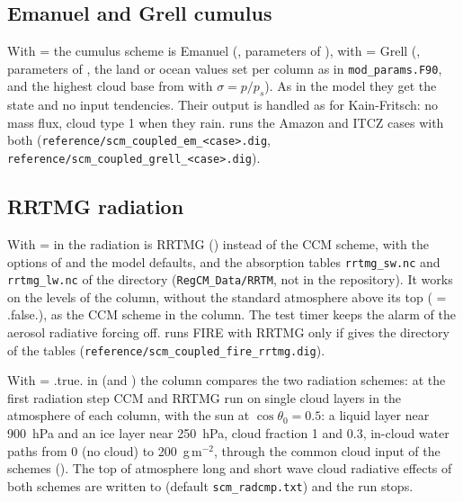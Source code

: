 \subsection{Emanuel and Grell cumulus}

With  =  the cumulus scheme is Emanuel
(, parameters of ), with
 =  Grell
(, parameters of , the land or ocean
values set per column as in \verb=mod_params.F90=, and the highest cloud
base from  with $\sigma = p/p_s$). As in the model they get
the state and no input tendencies. Their output is handled as for
Kain-Fritsch: no mass flux, cloud type 1 when they rain. 
runs the Amazon and ITCZ cases with both
(\verb=reference/scm_coupled_em_<case>.dig=,
\verb=reference/scm_coupled_grell_<case>.dig=).

\subsection{RRTMG radiation}

With  =  in  the
radiation is RRTMG
() instead of the CCM scheme, with the options of
 and the model defaults, and the absorption tables
\verb=rrtmg_sw.nc= and \verb=rrtmg_lw.nc= of the directory
 (\verb=RegCM_Data/RRTM=, not in the repository). It works
on the levels of the column, without the standard atmosphere above its
top ( = .false.), as the CCM scheme in the column.
The test timer keeps the alarm of the aerosol radiative forcing off.
 runs FIRE with RRTMG only if  gives
the directory of the tables (\verb=reference/scm_coupled_fire_rrtmg.dig=).

With  = .true. in  (and )
the column compares the two radiation schemes: at the first radiation
step CCM and RRTMG run on single cloud layers in the atmosphere of each
column, with the sun at $\cos\theta_0 = 0.5$: a liquid layer near
900~hPa and an ice layer near 250~hPa, cloud fraction 1 and 0.3, in-cloud
water paths from 0 (no cloud) to 200~g\,m$^{-2}$, through the common cloud
input of the schemes ().  The top of atmosphere long
and short wave cloud radiative effects of both schemes are written to
 (default \verb=scm_radcmp.txt=) and the run stops.

